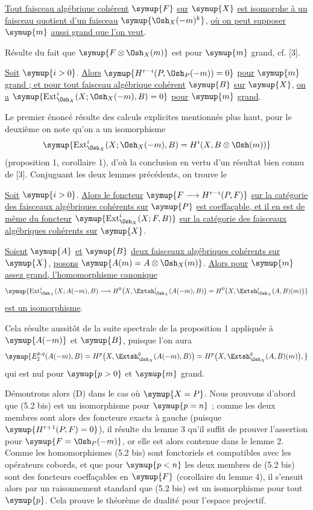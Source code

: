  \uline{Tout faisceau algébrique cohérent} $\symup{F}$ \uline{sur} $\symup{X}$ \uline{est isomorphe à
un faisceau quotient d'un faisceau} $\symup{\Osh_X(-m)^{k}}$, \uline{où on peut supposer} $\symup{m}$
\uline{aussi grand que l'on veut}.

Résulte du fait que $\symup{F\otimes\Osh_X(m)}$ est  pour
$\symup{m}$ grand, cf. [3].

 \uline{Soit} $\symup{i>0}$. \uline{Alors}
$\symup{H^{r-i}(P,\Osh_P(-m))=0}$ \uline{pour} $\symup{m}$ \uline{grand ; et pour tout faisceau algébrique
cohérent} $\symup{B}$ \uline{sur} $\symup{X}$, \uline{on a} $\symup{\operatorname{Ext}_{\Osh_X}^{i}(X;\Osh_X(-m),B)=0}$ \uline{pour} $\symup{m}$ \uline{grand}.

Le premier énoncé résulte des calculs explicites mentionnés plus haut, pour le
deuxième on note qu'on a un isomorphisme
\[
  \symup{\operatorname{Ext}_{\Osh_X}^{i}(X;\Osh_X(-m),B)
  =H^{i}(X,B\otimes\Osh(m))}
\]
(proposition 1, corollaire 1), d'où la conclusion en vertu d'un résultat bien
connu de [3]. Conjuguant les deux lemmes précédents, on trouve le

 \uline{Soit} $\symup{i>0}$. \uline{Alors le foncteur}
$\symup{F\longrightarrow H^{r-i}(P,F)}$ \uline{sur la catégorie des faisceaux algébriques cohérents
sur} $\symup{P}$ \uline{est coeffaçable, et il en est de même du foncteur}
$\symup{\operatorname{Ext}_{\Osh_X}^{i}(X;F,B)}$ \uline{sur la catégorie des faisceaux
algébriques cohérents sur} $\symup{X}$.

 \uline{Soient} $\symup{A}$ \uline{et} $\symup{B}$ \uline{deux faisceaux algébriques cohérents sur}
$\symup{X}$, \uline{posons} $\symup{A(m)=A\otimes\Osh_X(m)}$. \uline{Alors pour} $\symup{m}$ \uline{assez grand,
l'homomorphisme canonique}
\[
  \symup{\operatorname{Ext}_{\Osh_X}^{i}(X;A(-m),B)
  \longrightarrow H^{0}\bigl(X,\Extsh_{\Osh_X}^{i}(A(-m),B)\bigr)
  =H^{0}\bigl(X,\Extsh_{\Osh_X}^{i}(A,B)(m)\bigr)}
\]
\uline{est un isomorphisme}.

Cela résulte aussitôt de la suite spectrale de la proposition 1 appliquée à
$\symup{A(-m)}$ et $\symup{B}$, puisque l'on aura
\[
  \symup{E_{2}^{p,q}(A(-m),B)
  =H^{p}\bigl(X,\Extsh_{\Osh_X}^{q}(A(-m),B)\bigr)
  =H^{p}\bigl(X,\Extsh_{\Osh_X}^{q}(A,B)(m)\bigr),}
\]
qui est nul pour $\symup{p>0}$ et $\symup{m}$ grand.

Démontrons alors (D) dans le cas où $\symup{X=P}$. Nous prouvons d'abord que (5.2 bis)
est un isomorphisme pour $\symup{p=n}$ ; comme les deux membres sont alors des
foncteurs exacts à gauche (puisque $\symup{H^{r+1}(P,F)=0}$), il résulte du lemme 3
qu'il suffit de prouver l'assertion pour $\symup{F=\Osh_P(-m)}$, or elle est alors
contenue dans le lemme 2. Comme les homomorphismes (5.2 bis) sont fonctoriels et
compatibles avec les opérateurs cobords, et que pour $\symup{p<n}$ les deux membres de
(5.2 bis) sont des foncteurs coeffaçables en $\symup{F}$ (corollaire du lemme 4), il
s'ensuit alors par un raisonnement standard que (5.2 bis) est un isomorphisme
pour tout $\symup{p}$. Cela prouve le théorème de dualité pour l'espace projectif.

